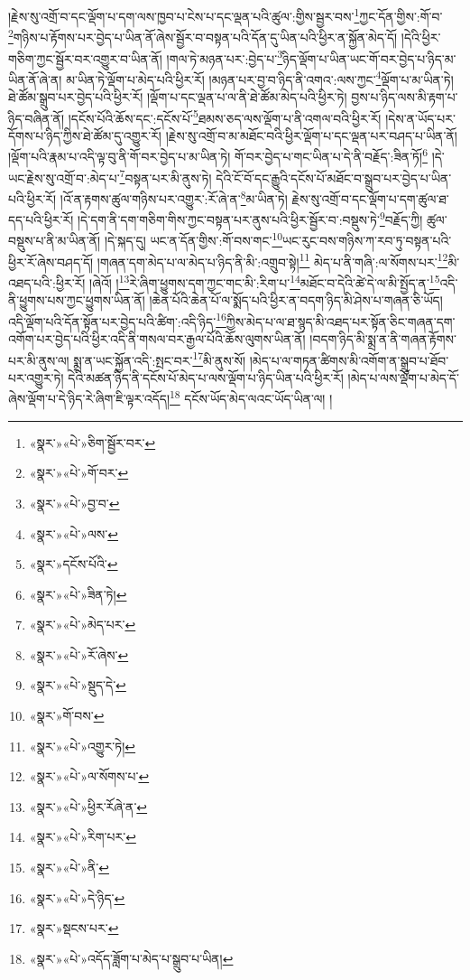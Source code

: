 །རྗེས་སུ་འགྲོ་བ་དང་ལྡོག་པ་དག་ལས་ཁྱབ་པ་ངེས་པ་དང་ལྡན་པའི་ཚུལ་:གྱིས་སྦྱར་བས་\footnote{«སྣར་»«པེ་»ཅིག་སྦྱོར་བར་}ཀྱང་དོན་གྱིས་:གོ་བ་\footnote{«སྣར་»«པེ་»གོ་བར་}གཉིས་པ་རྟོགས་པར་བྱེད་པ་ཡིན་ནོ་ཞེས་སྦྱོར་བ་བསྟན་པའི་དོན་དུ་ཡིན་པའི་ཕྱིར་ན་སྐྱོན་མེད་དོ། །དེའི་ཕྱིར་གཅིག་ཀྱང་སྦྱོར་བར་འགྱུར་བ་ཡིན་ནོ། །གལ་ཏེ་མཉན་པར་:བྱེད་པ་\footnote{«སྣར་»«པེ་»བྱ་བ་}ཉིད་ལྡོག་པ་ཡིན་ཡང་གོ་བར་བྱེད་པ་ཉིད་མ་ཡིན་ནོ་ཞེ་ན། མ་ཡིན་ཏེ་ལྡོག་པ་མེད་པའི་ཕྱིར་རོ། །མཉན་པར་བྱ་བ་ཉིད་ནི་འགའ་:ལས་ཀྱང་\footnote{«སྣར་»«པེ་»ལས་}ལྡོག་པ་མ་ཡིན་ཏེ། ཐེ་ཚོམ་སྒྲུབ་པར་བྱེད་པའི་ཕྱིར་རོ། །ལྡོག་པ་དང་ལྡན་པ་ལ་ནི་ཐེ་ཚོམ་མེད་པའི་ཕྱིར་ཏེ། བྱས་པ་ཉིད་ལས་མི་རྟག་པ་ཉིད་བཞིན་ནོ། །དངོས་པོའི་ཆོས་དང་:དངོས་པོ་\footnote{«སྣར་»དངོས་པོའི་}ཐམས་ཅད་ལས་ལྡོག་པ་ནི་འགལ་བའི་ཕྱིར་རོ། །དེས་ན་ཡོད་པར་དོགས་པ་ཉིད་ཀྱིས་ཐེ་ཚོམ་དུ་འགྱུར་རོ། །རྗེས་སུ་འགྲོ་བ་མ་མཐོང་བའི་ཕྱིར་ལྡོག་པ་དང་ལྡན་པར་བཤད་པ་ཡིན་ནོ། །ལྡོག་པའི་རྣམ་པ་འདི་ལྟ་བུ་ནི་གོ་བར་བྱེད་པ་མ་ཡིན་ཏེ། གོ་བར་བྱེད་པ་གང་ཡིན་པ་དེ་ནི་བརྗོད་:ཟིན་ཏོ།\footnote{«སྣར་»«པེ་»ཟིན་ཏེ།} །དེ་ཡང་རྗེས་སུ་འགྲོ་བ་:མེད་པ་\footnote{«སྣར་»«པེ་»མེད་པར་}བསྟན་པར་མི་ནུས་ཏེ། དེའི་ངོ་བོ་དང་རྒྱུའི་དངོས་པོ་མཐོང་བ་སྒྲུབ་པར་བྱེད་པ་ཡིན་པའི་ཕྱིར་རོ། །འོ་ན་རྟགས་ཚུལ་གཉིས་པར་འགྱུར་:རོ་ཞེ་ན་\footnote{«སྣར་»«པེ་»རོ་ཞེས་}མ་ཡིན་ཏེ། རྗེས་སུ་འགྲོ་བ་དང་ལྡོག་པ་དག་ཚུལ་ཐ་དད་པའི་ཕྱིར་རོ། །དེ་དག་ནི་དག་གཅིག་གིས་ཀྱང་བསྟན་པར་ནུས་པའི་ཕྱིར་སྦྱོར་བ་:བསྡུས་ཏེ་\footnote{«སྣར་»«པེ་»སྡུད་དེ་}བརྗོད་ཀྱི། ཚུལ་བསྡུས་པ་ནི་མ་ཡིན་ནོ། །དེ་སྐད་དུ། ཡང་ན་དོན་གྱིས་:གོ་བས་གང་\footnote{«སྣར་»གོ་བས་}ཡང་རུང་བས་གཉིས་ཀ་རབ་ཏུ་བསྟན་པའི་ཕྱིར་རོ་ཞེས་བཤད་དོ། །གཞན་དག་མེད་པ་ལ་མེད་པ་ཉིད་ནི་མི་:འགྲུབ་སྟེ།\footnote{«སྣར་»«པེ་»འགྱུར་ཏེ།} མེད་པ་ནི་གཞི་:ལ་སོགས་པར་\footnote{«སྣར་»«པེ་»ལ་སོགས་པ་}མི་འཐད་པའི་:ཕྱིར་རོ། །ཞེའོ། །\footnote{«སྣར་»«པེ་»ཕྱིར་རོཞེ་ན་}རེ་ཞིག་ཕྱུགས་དག་ཀྱང་གང་མི་:རིག་པ་\footnote{«སྣར་»«པེ་»རིག་པར་}མཐོང་བ་དེའི་ཚེ་དེ་ལ་མི་སྤྱོད་ན་\footnote{«སྣར་»«པེ་»ནི་}འདི་ནི་ཕྱུགས་པས་ཀྱང་ཕྱུགས་ཡིན་ནོ། །ཆེན་པོའི་ཆེན་པོ་ལ་སྨོད་པའི་ཕྱིར་ན་བདག་ཉིད་མི་ཤེས་པ་གཞན་ཅི་ཡོད། འདི་ལྡོག་པའི་དོན་སྟོན་པར་བྱེད་པའི་ཚིག་:འདི་ཉིད་\footnote{«སྣར་»«པེ་»དེ་ཉིད་}ཀྱིས་མེད་པ་ལ་ཐ་སྙད་མི་འཐད་པར་སྟོན་ཅིང་གཞན་དག་འགོག་པར་བྱེད་པའི་ཕྱིར་འདི་ནི་གསལ་བར་རྒྱལ་པོའི་ཆོས་ལུགས་ཡིན་ནོ། །བདག་ཉིད་མི་སྨྲ་ན་ནི་གཞན་རྟོགས་པར་མི་ནུས་ལ། སྨྲ་ན་ཡང་སྐྱོན་འདི་:སྤང་བར་\footnote{«སྣར་»སྡངས་པར་}མི་ནུས་སོ། །མེད་པ་ལ་གཏན་ཚིགས་མི་འགོག་ན་སྒྲུབ་པ་ཐོབ་པར་འགྱུར་ཏེ། དེའི་མཚན་ཉིད་ནི་དངོས་པོ་མེད་པ་ལས་ལྡོག་པ་ཉིད་ཡིན་པའི་ཕྱིར་རོ། །མེད་པ་ལས་ལྡོག་པ་མེད་དོ་ཞེས་ལྡོག་པ་དེ་ཉིད་རེ་ཞིག་ཇི་ལྟར་འདོད།\footnote{«སྣར་»«པེ་»འདོད་ཟློག་པ་མེད་པ་སྒྲུབ་པ་ཡིན།} དངོས་ཡོད་མེད་ལའང་ཡོད་ཡིན་ལ། །
